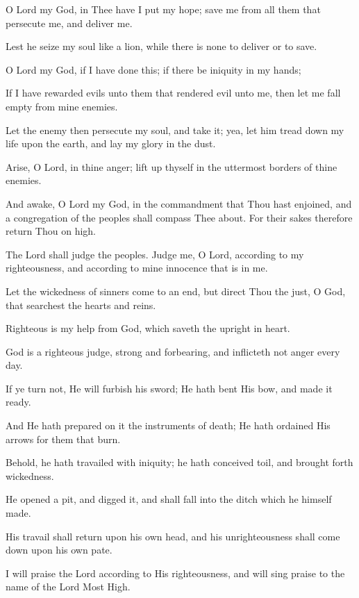O Lord my God, in Thee have I put my hope; save me from all them that persecute me, and deliver me.

Lest he seize my soul like a lion, while there is none to deliver or to save.

O Lord my God, if I have done this; if there be iniquity in my hands;

If I have rewarded evils unto them that rendered evil unto me, then let me fall empty from mine enemies.

Let the enemy then persecute my soul, and take it; yea, let him tread down my life upon the earth, and lay my glory in the dust.

Arise, O Lord, in thine anger; lift up thyself in the uttermost borders of thine enemies.

And awake, O Lord my God, in the commandment that Thou hast enjoined, and a congregation of the peoples shall compass Thee about. For their sakes therefore return Thou on high.

The Lord shall judge the peoples. Judge me, O Lord, according to my righteousness, and according to mine innocence that is in me.

Let the wickedness of sinners come to an end, but direct Thou the just, O God, that searchest the hearts and reins.

Righteous is my help from God, which saveth the upright in heart.

God is a righteous judge, strong and forbearing, and inflicteth not anger every day.

If ye turn not, He will furbish his sword; He hath bent His bow, and made it ready.

And He hath prepared on it the instruments of death; He hath ordained His arrows for them that burn.

Behold, he hath travailed with iniquity; he hath conceived toil, and brought forth wickedness.

He opened a pit, and digged it, and shall fall into the ditch which he himself made.

His travail shall return upon his own head, and his unrighteousness shall come down upon his own pate.

I will praise the Lord according to His righteousness, and will sing praise to the name of the Lord Most High.
